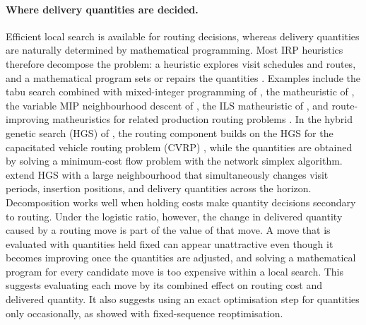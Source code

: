 \documentclass{article}
\begin{document}
\paragraph{Where delivery quantities are decided.}
Efficient local search is available for routing decisions, whereas delivery
quantities are naturally determined by mathematical programming. Most IRP
heuristics therefore decompose the problem: a heuristic explores visit
schedules and routes, and a mathematical program sets or repairs the
quantities \citep{iswari2026extending}. Examples include the tabu search
combined with mixed-integer programming of \citet{archetti2012hybrid}, the
matheuristic of \citet{archetti2017matheuristic}, the variable MIP
neighbourhood descent of \citet{coelho2020variable}, the ILS matheuristic of
\citet{lagana2024iterated}, and route-improving matheuristics for related
production routing problems \citep{vadseth2023multi}. In the hybrid genetic
search (HGS) of \citet{castro2026hybrid}, the routing component builds on the
HGS for the capacitated vehicle routing problem (CVRP)
\citep{vidal2022hybrid}, while the quantities are obtained by solving a
minimum-cost flow problem with the network simplex algorithm.
\citet{zhao2025large} extend HGS with a large neighbourhood that
simultaneously changes visit periods, insertion positions, and delivery
quantities across the horizon. Decomposition works well when holding costs
make quantity decisions secondary to routing. Under the logistic ratio,
however, the change in delivered quantity caused by a routing move is part
of the value of that move. A move that is evaluated with quantities held
fixed can appear unattractive even though it becomes improving once the
quantities are adjusted, and solving a mathematical program for every
candidate move is too expensive within a local search. This suggests
evaluating each move by its combined effect on routing cost and delivered
quantity. It also suggests using an exact optimisation step for quantities
only occasionally, as \citet{he2020fixedsequence} showed with fixed-sequence
reoptimisation.
\end{document}
